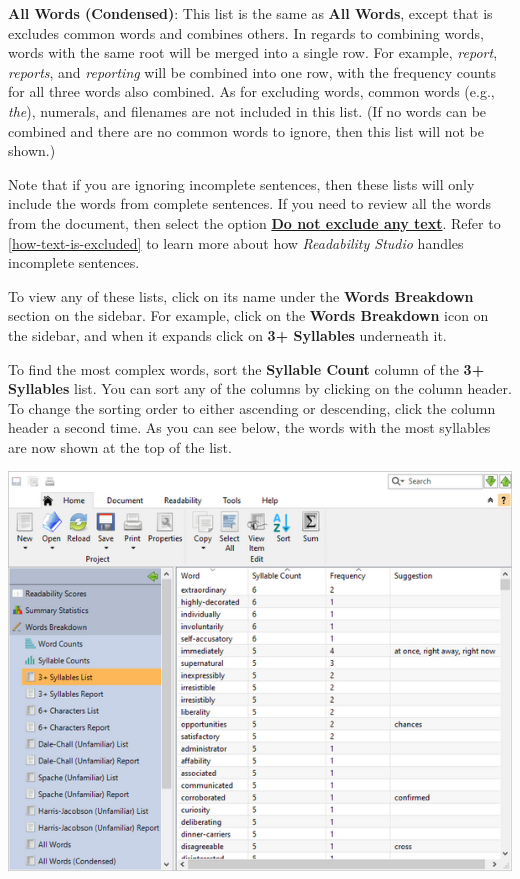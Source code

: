 \documentclass[
]{book}
\theoremstyle{definition}
\theoremstyle{definition}
\theoremstyle{definition}
\theoremstyle{definition}
\theoremstyle{remark}
\begin{document}
\textbf{All Words (Condensed)}: This list is the same as \textbf{All Words}, except that is excludes common words and combines others. In regards to combining words, words with the same root will be merged into a single row. For example, \emph{report}, \emph{reports}, and \emph{reporting} will be combined into one row, with the frequency counts for all three words also combined. As for excluding words, common words (e.g., \emph{the}), numerals, and filenames are not included in this list. (If no words can be combined and there are no common words to ignore, then this list will not be shown.)

Note that if you are ignoring incomplete sentences, then these lists will only include the words from complete sentences. If you need to review all the words from the document, then select the option \protect\hyperlink{options-text-exclusion}{\textbf{Do not exclude any text}}. Refer to \ref{how-text-is-excluded} to learn more about how \emph{Readability Studio} handles incomplete sentences.

To view any of these lists, click on its name under the \textbf{Words Breakdown} section on the sidebar. For example, click on the \textbf{Words Breakdown} icon on the sidebar, and when it expands click on \textbf{3+ Syllables} underneath it.

To find the most complex words, sort the \textbf{Syllable Count} column of the \textbf{3+ Syllables} list. You can sort any of the columns by clicking on the column header. To change the sorting order to either ascending or descending, click the column header a second time. As you can see below, the words with the most syllables are now shown at the top of the list.

\includegraphics{Images/difficultwords.png}
\end{document}
